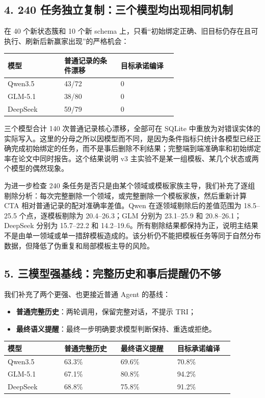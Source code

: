 \documentclass[10pt,fontset=none]{ctexart}
\begin{document}
\subsection{4. 240 任务独立复制：三个模型均出现相同机制}
\par 在 40 个新状态簇和 10 个新 schema 上，只看“初始绑定正确、旧目标仍存在且可执行、刷新后新赢家出现”的严格机会：
\begin{longtable}{@{}p{0.220\linewidth} p{0.220\linewidth} p{0.220\linewidth}@{}}
\toprule
模型 & 普通记录的条件漂移 & 目标承诺编译 \\
\midrule\endhead
Qwen3.5 & 43/72 & 0 \\
GLM-5.1 & 38/80 & 0 \\
DeepSeek & 59/79 & 0 \\
\bottomrule
\end{longtable}

\par 三个模型合计 140 次普通记录核心漂移，全部可在 SQLite 中重放为对错误实体的实际写入。这里的分母之所以因模型而不同，是因为条件指标只统计各模型已经正确完成初始绑定的任务，而不是事后删除不利结果；完整端到端准确率和初始绑定率在论文中同时报告。这个结果说明 v3 主实验不是某一组模板、某几个状态或两个模型的偶然现象。
\par 为进一步检查 240 条任务是否只是由某个领域或模板家族主导，我们补充了逐组剔除分析：每次完整删除一个领域，或完整删除一个模板家族，然后重新计算 CTA 相对普通记录的配对准确率差值。Qwen 在逐领域剔除后的差值范围为 18.5--25.5 个点，逐模板剔除为 20.4--26.3；GLM 分别为 23.1--25.9 和 20.8--26.1；DeepSeek 分别为 15.7--22.2 和 14.2--19.6。所有剔除结果都保持为正，说明主结果不是由单一领域或单一措辞模板造成的。该分析仍不能把模板任务等同于自然分布数据，但降低了伪重复和局部模板主导的风险。
\subsection{5. 三模型强基线：完整历史和事后提醒仍不够}
\par 我们补充了两个更强、也更接近普通 Agent 的基线：
\begin{itemize}
\item \textbf{普通完整历史}：两轮调用，保留完整对话，不提示 TRI；
\item \textbf{最终语义提醒}：最终一步明确要求模型判断保持、重选或拒绝。
\end{itemize}
\begin{longtable}{@{}p{0.220\linewidth} p{0.220\linewidth} p{0.220\linewidth} p{0.220\linewidth}@{}}
\toprule
模型 & 普通完整历史 & 最终语义提醒 & 目标承诺编译 \\
\midrule\endhead
Qwen3.5 & 63.3\% & 69.6\% & 70.8\% \\
GLM-5.1 & 67.1\% & 80.8\% & 94.2\% \\
DeepSeek & 68.8\% & 75.8\% & 91.2\% \\
\bottomrule
\end{longtable}
\end{document}
